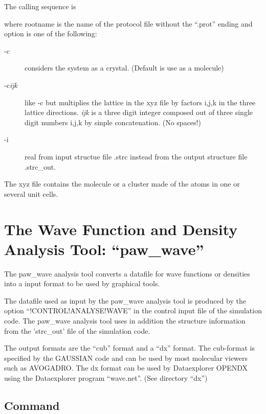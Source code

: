 \documentclass[final,12pt]{article}
\begin{document}
{{{{{{The calling sequence is

\bigskip{}\bigskip

\noindent
where rootname is the name of the protocol file without the ``.prot''
ending and option is one of the following:
\begin{description}
\item[-c] considers the system as a crystal. (Default is use as a molecule)
\item[-c\textit{ijk}] like -c but multiplies the lattice in the xyz
  file by factors i,j,k in the three lattice directions. \textit{ijk}
  is a three digit integer composed out of three single digit numbers
  i,j,k by sinple concatenation. (No spaces!)
\item[-i] real from input structue file .strc instead from the output
  structure file .strc\_out.
\end{description}

The xyz file contains the molecule or a cluster made of the atoms in
one or several unit cells.


\newpage
\section{The Wave Function and Density Analysis Tool: ``paw\_wave''}
The paw\_wave analysis tool converts a datafile for wave functions or
densities into a input format to be used by graphical tools. 

The datafile used as input by the paw\_wave analysis tool is produced
by the option ``!CONTROL!ANALYSE!WAVE'' in the control input file of
the simulation code. The paw\_wave analysis tool uses in addition 
the structure information from  the 'strc\_out' file of the simulation code.

The output formats are the ``cub'' format and a ``dx'' format.  The
cub-format is specified by the GAUSSIAN code and can be used by most
molecular viewers such as AVOGADRO. The dx format can be used by
Dataexplorer OPENDX \cite{opendx} using the Dataexplorer program
``wave.net''. (See directory ``dx'')

\subsection{Command}

}}}}}}
\end{document}
